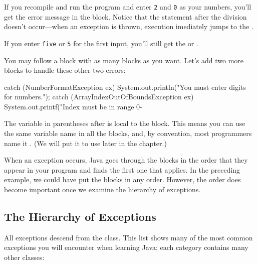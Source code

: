 If you recompile and run the program and enter \texttt{2} and \texttt{0} as your numbers, you'll get the error message in the  block. Notice that the  statement after the division doesn't occur---when an exception is thrown, execution imediately jumps to the .

If you enter \texttt{five} or \texttt{5} for the first input, you'll still get the  or .
 
You may follow a  block with as many  blocks as you want. Let's add two more  blocks to handle these other two errors:

\begin{code}
catch (NumberFormatException ex) {
    System.out.println("You must enter digits for numbers.");
}
catch (ArrayIndexOutOfBoundsException ex) {
    System.out.printf("Index must be in range 0-%
}
\end{code}

The variable in parentheses after  is local to the  block. This means you can use the same variable name in all the  blocks, and, by convention, most programmers name it . (We will put it to use later in the chapter.)

When an exception occurs, Java goes through the  blocks in the order that they appear in your program and finds the first one that applies. In the preceding example, we could have put the  blocks in any order. However, the order does become important once we examine the hierarchy of exceptions.

\subsection{The Hierarchy of Exceptions}

All exceptions descend from the  class\footnotemark. This list shows many of the most common exceptions you will encounter when learning Java; each category contains many other classes:


